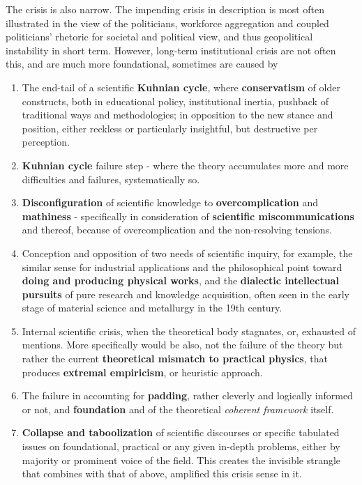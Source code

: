\documentclass[10pt,a4paper]{article}
\begin{document}
The crisis is also narrow. The impending crisis in description is most often illustrated in the view of the politicians, workforce aggregation and coupled politicians' rhetoric for societal and political view, and thus geopolitical instability in short term. However, long-term institutional crisis are not often this, and are much more foundational, sometimes are caused by 
\begin{enumerate}
    \item The end-tail of a scientific \textbf{Kuhnian cycle}, where \textbf{conservatism} of older constructs, both in educational policy, institutional inertia, pushback of traditional ways and methodologies; in opposition to the new stance and position, either reckless or particularly insightful, but destructive per perception. 
    \item \textbf{Kuhnian cycle} failure step - where the theory accumulates more and more difficulties and failures, systematically so. 
    \item \textbf{Disconfiguration} of scientific knowledge to \textbf{overcomplication} and \textbf{mathiness} - specifically in consideration of \textbf{scientific miscommunications} and thereof, because of overcomplication and the non-resolving tensions. 
    \item Conception and opposition of two needs of scientific inquiry, for example, the similar sense for industrial applications and the philosophical point toward \textbf{doing and producing physical works}, and the \textbf{dialectic intellectual pursuits} of pure research and knowledge acquisition, often seen in the early stage of material science and metallurgy in the 19th century. 
    \item Internal scientific crisis, when the theoretical body stagnates, or, exhausted of mentions. More specifically would be also, not the failure of the theory but rather the current \textbf{theoretical mismatch to practical physics}, that produces \textbf{extremal empiricism}, or heuristic approach. 
    \item The failure in accounting for \textbf{padding}, rather cleverly and logically informed or not, and \textbf{foundation} and of the theoretical \textit{coherent framework} itself. 
    \item \textbf{Collapse and taboolization} of scientific discourses or specific tabulated issues on foundational, practical or any given in-depth problems, either by majority or prominent voice of the field. This creates the invisible strangle that combines with that of above, amplified this crisis sense in it.
\end{enumerate}
\end{document}
